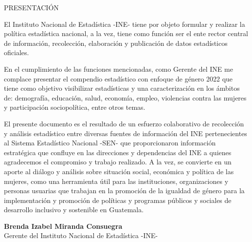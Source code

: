 $\ $\\[3cm]
\begin{center}
{\Bold \LARGE PRESENTACIÓN}\\[2cm]
\end{center}

El Instituto Nacional de Estadística -INE- tiene por objeto formular y realizar la política estadística nacional, a la vez, tiene como función ser el ente rector central de información, recolección, elaboración y publicación de datos estadísticos oficiales.  

En el cumplimiento de las funciones mencionadas, como Gerente del INE me complace presentar el compendio estadístico con enfoque de género 2022 que tiene como objetivo visibilizar estadísticas y una caracterización en los ámbitos de: demografía, educación, salud, economía, empleo, violencias contra las mujeres y participación sociopolítica, entre otros temas. 

El presente documento es el resultado de un esfuerzo colaborativo de recolección y análisis estadístico entre diversas fuentes de información del INE pertenecientes al Sistema Estadístico Nacional -SEN- que proporcionaron información estratégica que confluye en las direcciones y dependencias del INE a quienes agradecemos el compromiso y trabajo realizado. A la vez, se convierte en un aporte al diálogo y análisis sobre situación social, económica y política de las mujeres, como una herramienta útil para las instituciones, organizaciones y personas usuarias que trabajan en la promoción de la igualdad de género para la implementación y promoción de políticas y programas públicos y sociales de desarrollo inclusivo y sostenible en Guatemala.\\[3cm]

\begin{center}
\textbf{Brenda Izabel Miranda Consuegra}\\[0.2cm]
Gerente del Instituto Nacional de Estadística -INE-
\end{center}

